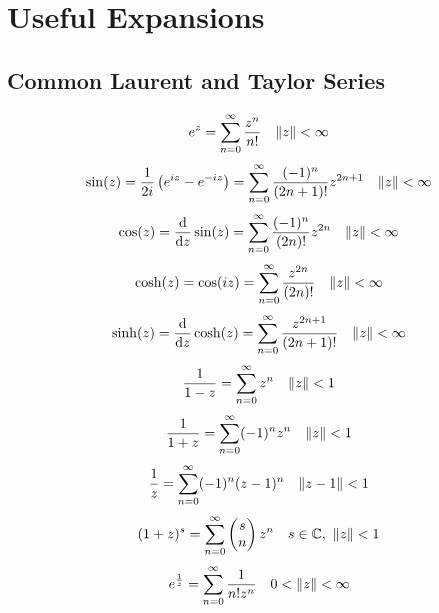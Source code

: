 \documentclass[../complete.tex]{subfiles}
\begin{document}
\chapter{Useful Expansions}
\section{Common Laurent and Taylor Series}
\begin{equation}
	e^z=\sum_{n=0}^\infty\frac{z^n}{n!}\quad\norm{z}<\infty
	\label{eq:expser}
\end{equation}
\begin{equation}
	\sin(z)=\frac{1}{2i}\left( e^{iz}-e^{-iz} \right)=\sum_{n=0}^{\infty}\frac{(-1)^n}{(2n+1)!}z^{2n+1}\quad\norm{z}<\infty
	\label{eq:sinser}
\end{equation}
\begin{equation}
	\cos(z)=\derivative{z}\sin(z)=\sum_{n=0}^{\infty}\frac{(-1)^n}{(2n)!}z^{2n}\quad\norm{z}<\infty
	\label{eq:cosser}
\end{equation}
\begin{equation}
	\cosh(z)=\cos(iz)=\sum_{n=0}^{\infty}\frac{z^{2n}}{(2n)!}\quad\norm{z}<\infty
	\label{eq:coshser}
\end{equation}
\begin{equation}
	\sinh(z)=\derivative{z}\cosh(z)=\sum_{n=0}^{\infty}\frac{z^{2n+1}}{(2n+1)!}\quad\norm{z}<\infty
	\label{eq:sinhser}
\end{equation}
\begin{equation}
	\frac{1}{1-z}=\sum_{n=0}^{\infty}z^n\quad\norm{z}<1
	\label{eq:geomser}
\end{equation}
\begin{equation}
	\frac{1}{1+z}=\sum_{n=0}^{\infty}(-1)^nz^n\quad\norm{z}<1
	\label{eq:geomminoneser}
\end{equation}
\begin{equation}
	\frac{1}{z}=\sum_{n=0}^{\infty}(-1)^n(z-1)^n\quad\norm{z-1}<1
	\label{eq:zminoneser}
\end{equation}
\begin{equation}
	(1+z)^s=\sum_{n=0}^{\infty}\begin{pmatrix}s\\n\end{pmatrix}z^n\quad s\in\mathbb{C},\ \norm{z}<1
	\label{eq:binomser}
\end{equation}
\begin{equation}
	e^{\frac{1}{z}}=\sum_{n=0}^{\infty}\frac{1}{n!z^n}\quad0<\norm{z}<\infty
	\label{eq:explaur}
\end{equation}
\end{document}
